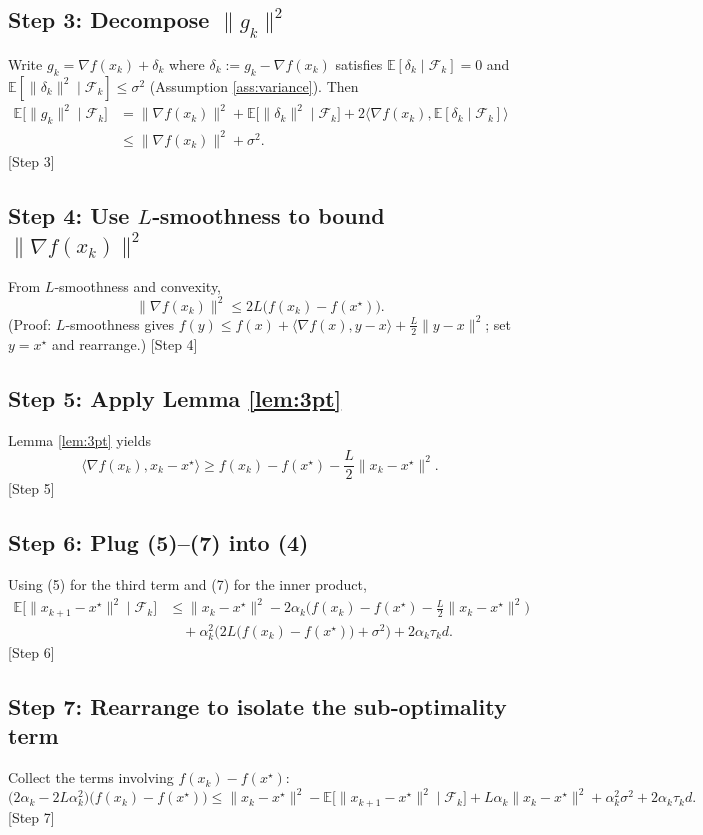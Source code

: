\documentclass{article}
\newcommand{\E}{\mathbb{E}}
\begin{document}
\subsection*{Step 3: Decompose $\|g_{k}\|^{2}$}
Write $g_{k}=\nabla f(x_{k})+ \delta_{k}$ where $\delta_{k}:=g_{k}-\nabla f(x_{k})$ satisfies $\E[\delta_{k}\mid\mathcal F_{k}]=0$ and $\E[\|\delta_{k}\|^{2}\mid\mathcal F_{k}]\le\sigma^{2}$ (Assumption \ref{ass:variance}). Then
\begin{align}
\E\!\big[\|g_{k}\|^{2}\mid\mathcal F_{k}\big]
&=\|\nabla f(x_{k})\|^{2}+ \E\!\big[\|\delta_{k}\|^{2}\mid\mathcal F_{k}\big]
+2\langle\nabla f(x_{k}),\E[\delta_{k}\mid\mathcal F_{k}]\rangle \nonumber\\
&\le \|\nabla f(x_{k})\|^{2}+\sigma^{2}. \tag{5}
\end{align}
[Step 3]

\subsection*{Step 4: Use $L$‑smoothness to bound $\|\nabla f(x_{k})\|^{2}$}
From $L$‑smoothness and convexity,
\[
\|\nabla f(x_{k})\|^{2}\le 2L\big(f(x_{k})-f(x^{\star})\big). \tag{6}
\]
(Proof: $L$‑smoothness gives $f(y)\le f(x)+\langle\nabla f(x),y-x\rangle+\frac{L}{2}\|y-x\|^{2}$; set $y=x^{\star}$ and rearrange.)  
[Step 4]

\subsection*{Step 5: Apply Lemma \ref{lem:3pt}}
Lemma \ref{lem:3pt} yields
\[
\langle\nabla f(x_{k}),x_{k}-x^{\star}\rangle\ge f(x_{k})-f(x^{\star})-\frac{L}{2}\|x_{k}-x^{\star}\|^{2}. \tag{7}
\]
[Step 5]

\subsection*{Step 6: Plug (5)–(7) into (4)}
Using (5) for the third term and (7) for the inner product,
\begin{align}
\E\!\big[\|x_{k+1}-x^{\star}\|^{2}\mid\mathcal F_{k}\big]
&\le \|x_{k}-x^{\star}\|^{2}
-2\alpha_{k}\Big(f(x_{k})-f(x^{\star})-\frac{L}{2}\|x_{k}-x^{\star}\|^{2}\Big) \nonumber\\
&\quad +\alpha_{k}^{2}\big(2L\big(f(x_{k})-f(x^{\star})\big)+\sigma^{2}\big)
+2\alpha_{k}\tau_{k}d . \tag{8}
\end{align}
[Step 6]

\subsection*{Step 7: Rearrange to isolate the sub‑optimality term}
Collect the terms involving $f(x_{k})-f(x^{\star})$:
\[
\big(2\alpha_{k}-2L\alpha_{k}^{2}\big)\big(f(x_{k})-f(x^{\star})\big)
\le \|x_{k}-x^{\star}\|^{2}-\E\!\big[\|x_{k+1}-x^{\star}\|^{2}\mid\mathcal F_{k}\big]
+L\alpha_{k}\|x_{k}-x^{\star}\|^{2}
+\alpha_{k}^{2}\sigma^{2}+2\alpha_{k}\tau_{k}d . \tag{9}
\]
[Step 7]
\end{document}
